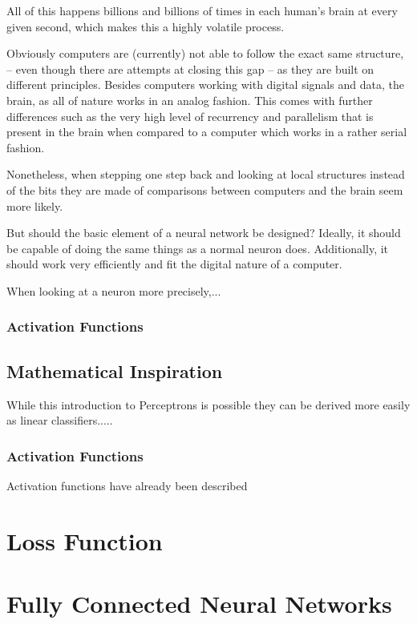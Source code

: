 All of this happens billions and billions of times in each human's brain at every
given second, which makes this a highly volatile process.

Obviously computers are (currently) not able to follow the exact same structure,
 -- even though there are attempts at closing this gap \cite{brainscales} --
as they are built on different principles.
Besides computers working with digital signals and data, the brain, as all of nature
works in an analog fashion.
This comes with further differences such as the very high level of recurrency and 
parallelism that is present in the brain when compared to a computer which works
in a rather serial fashion.

Nonetheless, when stepping one step back and looking at local structures instead of
the bits they are made of comparisons between computers and the brain seem more likely.

But should the basic element of a neural network be designed?
Ideally, it should be capable of doing the same things as a normal neuron does.
Additionally, it should work very efficiently and fit the digital nature of a computer.

When looking at a neuron more precisely,...
\subsubsection{Activation Functions}

\subsection{Mathematical Inspiration}

While this introduction to Perceptrons is possible they can be derived more easily
as linear classifiers.....


\subsubsection{Activation Functions}
Activation functions have already been described 

\section{Loss Function}

\section{Fully Connected Neural Networks}
